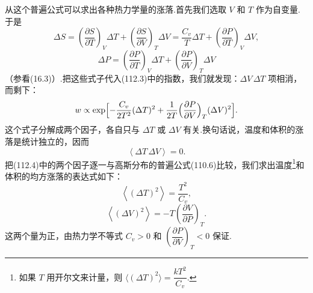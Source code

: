 从这个普遍公式可以求出各种热力学量的涨落.首先我们选取 $V$ 和 $T$ 作为自变量.于是
\begin{equation*}
  \Delta S=\left(\frac{\partial S}{\partial T}\right)_{V}\Delta T
  +\left(\frac{\partial S}{\partial V}\right)_{T}\Delta V
  =\frac{C_{v}}{T}\Delta T+\left(\frac{\partial P}{\partial T}\right)_{V}\Delta V,
\end{equation*}
\begin{equation*}
  \Delta P=\left(\frac{\partial P}{\partial T}\right)_{V}\Delta T
  +\left(\frac{\partial P}{\partial V}\right)_{T}\Delta V
\end{equation*}
（参看(16.3)）.把这些式子代入(112.3)中的指数，我们就发现：$\Delta V\,\Delta T$ 项相消，而剩下：
\begin{equation}
  w\propto\exp\Bigl[-\frac{C_{v}}{2T^{2}}(\Delta T)^{2}
  +\frac{1}{2T}\Bigl(\frac{\partial P}{\partial V}\Bigr)_{T}(\Delta V)^{2}\Bigr].
\end{equation}
这个式子分解成两个因子，各自只与 $\Delta T$ 或 $\Delta V$ 有关.换句话说，温度和体积的涨落是统计独立的，因而
\begin{equation}
  \left\langle\Delta T\,\Delta V\right\rangle=0.
\end{equation}
把(112.4)中的两个因子逐一与高斯分布的普遍公式(110.6)比较，我们求出温度\footnote{如果 $T$ 用开尔文来计量，则 $\langle(\Delta T)^{2}\rangle=\dfrac{kT^{2}}{C_{v}}$.}和体积的均方涨落的表达式如下：
\begin{equation}
  \left\langle(\Delta T)^{2}\right\rangle=\frac{T^{2}}{C_{v}},
\end{equation}
\begin{equation}
  \left\langle(\Delta V)^{2}\right\rangle
  =-T\left(\frac{\partial V}{\partial P}\right)_{T}.
\end{equation}
这两个量为正，由热力学不等式 $C_{v}>0$ 和
$\left(\dfrac{\partial P}{\partial V}\right)_{T}<0$ 保证.

